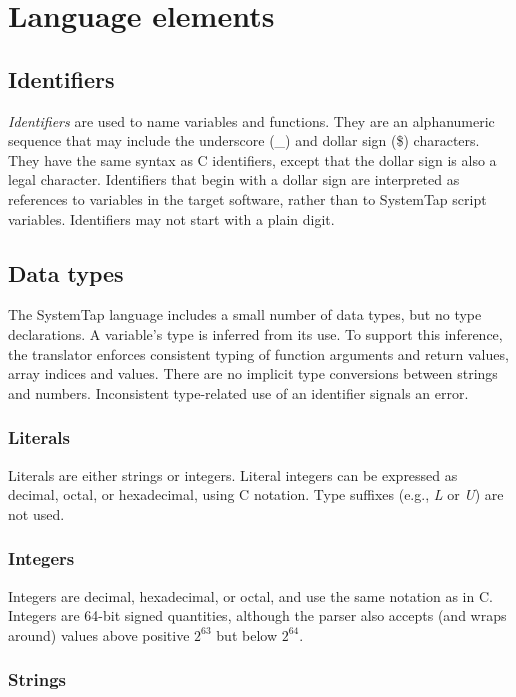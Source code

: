 \documentclass[twoside,english]{article}
\begin{document}
\section{Language elements\label{sec:Language-Elements}}
\subsection{Identifiers}
\emph{Identifiers} are used to name variables and functions. They are an
alphanumeric sequence that may include the underscore (\_) and dollar sign
(\$) characters. They have the same syntax as C identifiers, except that
the dollar sign is also a legal character. Identifiers that begin with a
dollar sign are interpreted as references to variables in the target software,
rather than to SystemTap script variables. Identifiers may not start with
a plain digit.


\subsection{Data types\label{sub:Data-types}}
The SystemTap language includes a small number of data types, but no type
declarations. A variable's type is inferred from its use.
To support this inference, the translator enforces consistent typing of function
arguments and return values, array indices and values. There are no implicit
type conversions between strings and numbers. Inconsistent type-related use
of an identifier signals an error.


\subsubsection{Literals}
Literals are either strings or integers.
Literal integers can be expressed as decimal,
octal, or hexadecimal, using C notation. Type suffixes (e.g., \emph{L} or
\emph{U}) are not used.


\subsubsection{Integers\label{sub:Integers}}
 
Integers are decimal, hexadecimal, or octal, and use the same notation as
in C. Integers are 64-bit signed quantities, although the parser also accepts
(and wraps around) values above positive $2^{63}$ but below $2^{64}$.


\subsubsection{Strings\label{sub:Strings}}
\end{document}
